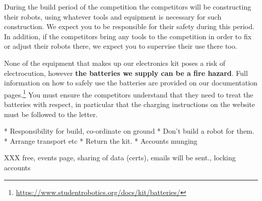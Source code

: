 \documentclass[a4paper]{article}
\begin{document}
During the build period of the competition the competitors will be constructing
their robots, using whatever tools and equipment is necessary for such
construction. We expect you to be responsible for their safety during this
period. In addition, if the competitors bring any tools to the competition in
order to fix or adjust their robots there, we expect you to supervise their use
there too.

None of the equipment that makes up our electronics kit poses a risk of
electrocution, however \textbf{the batteries we supply can be a fire hazard}.
Full information on how to safely use the batteries are provided on our
documentation
pages.\footnote{\url{https://www.studentrobotics.org/docs/kit/batteries/}}
You must ensure the competitors understand that they need to treat the
batteries with respect, in particular that the charging instructions on
the website must be followed to the letter.



 * Responsibility for build, co-ordinate on ground
   * Don't build a robot for them.
 * Arrange transport etc
 * Return the kit.
 * Accounts munging
 
XXX free, events page, sharing of data (certs), emails will be sent., locking accounts
\end{document}
